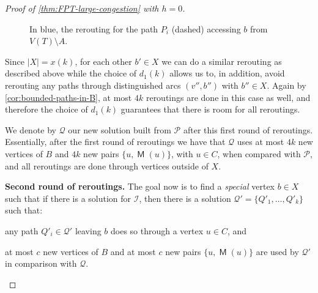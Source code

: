 \documentclass[a4paper,UKenglish,cleveref, autoref, thm-restate]{lipics-v2021}
\DeclareMathOperator{\Mat}{\mathsf M}
\begin{document}
\begin{proof}[Proof of \autoref{thm:FPT-large-congestion} with $h = 0$]
\begin{figure}[h]
  \centering
  \caption{In blue, the rerouting for the path $P_i$ (dashed) accessing $b$ from $V(T) \setminus A$.}
  \label{fig:rerouting-for-X}
\end{figure}

Since $|X| = x(k)$, for each other $b' \in X$ we can do a similar rerouting as described above while the choice of $d_1(k)$ allows us to, in addition, avoid rerouting any paths through distinguished arcs $(v'',b'')$ with $b'' \in X$.
Again by \autoref{cor:bounded-paths-in-B}, at most $4k$ reroutings are done in this case as well, and therefore the choice of $d_1(k)$ guarantees that there is room for all reroutings.

We denote by $\mathcal{Q}$ our new solution built from $\mathcal{P}$ after this first round of reroutings.
Essentially, after the first round of reroutings we have that $\mathcal{Q}$ uses at most $4k$ new vertices of $B$ and $4k$ new pairs $\{u, \Mat(u)\}$, with $u \in C$, when compared with $\mathcal{P}$, and all reroutings are done through vertices outside of $X$.

\medskip
\noindent\textbf{Second round of reroutings.}
The goal now is to find a \emph{special} vertex $b \in X$ such that if there is a solution for $\mathcal{I}$, then there is a solution $\mathcal{Q}' = \{Q'_1, \ldots, Q'_k\}$ such that:
\begin{alphaenumerate}
  \item any path $Q'_i \in \mathcal{Q}'$ leaving $b$ does so through a vertex $u \in C$, and
  \item at most $c$ new vertices of $B$ and at most $c$ new pairs $\{u, \Mat(u)\}$ are used by $\mathcal{Q}'$ in comparison with $\mathcal{Q}$.
\end{alphaenumerate} 


\end{proof}
\end{document}
